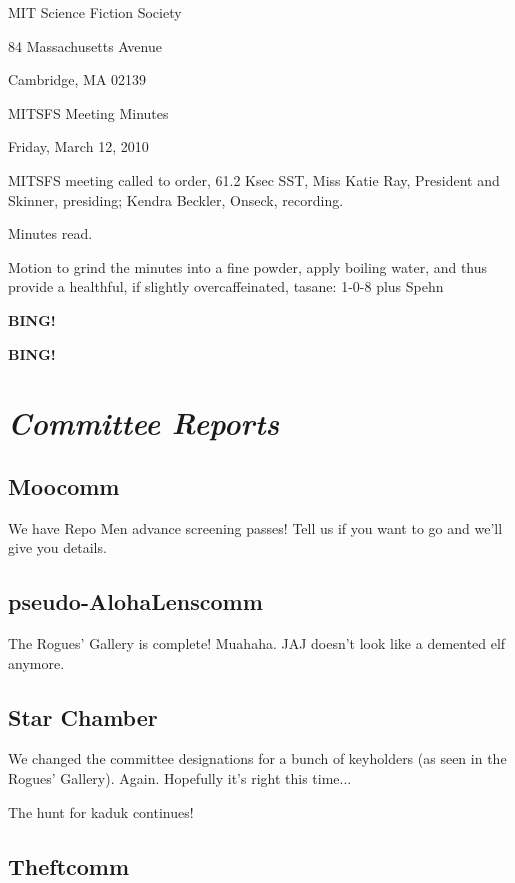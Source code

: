 \documentclass[10pt]{article}
\newcommand{\bing}{{\bf BING!} }
\newcommand{\goto}[1]{\bing \vskip 12pt \section*{{\em{#1}}}}
\newcommand{\ps}{ plus Spehn\xspace}
\newcommand{\skinner}{Miss Katie Ray, President and Skinner}
\newcommand{\onseck}{Kendra Beckler, Onseck}
\newcommand{\meetingdate}{Friday, March 12, 2010}
\begin{document}
\begin{center}

MIT Science Fiction Society

84 Massachusetts Avenue

Cambridge, MA 02139

\vspace{12pt}

MITSFS Meeting Minutes

\meetingdate

\end{center}

\vspace{18pt}

\setlength{\parskip}{6pt}

\noindent
MITSFS meeting called to order, 61.2 Ksec SST,
\skinner, presiding; \onseck, recording.

Minutes read.

Motion to grind the minutes into a fine powder, apply boiling water, and thus provide a healthful, if slightly overcaffeinated, tasane: 1-0-8 \ps

\bing

\goto{Committee Reports}

\subsection*{Moocomm}

We have Repo Men advance screening passes!  Tell us if you want to go and we'll give you details.

\subsection*{pseudo-AlohaLenscomm}

The Rogues' Gallery is complete!  Muahaha.  JAJ doesn't look like a demented elf anymore.

\subsection*{Star Chamber}

We changed the committee designations for a bunch of keyholders (as seen in the Rogues' Gallery).  Again.  Hopefully it's right this time...

The hunt for kaduk continues!

\subsection*{Theftcomm}
\end{document}
